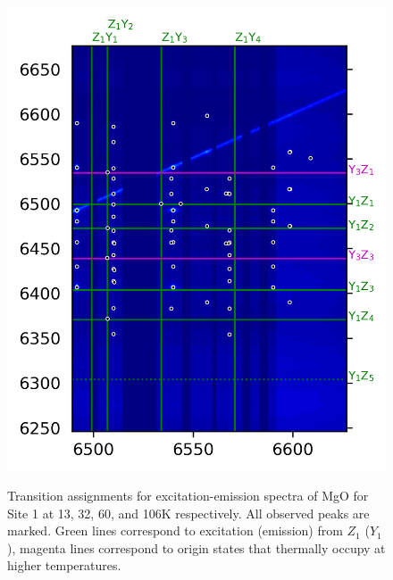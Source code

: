\documentclass[12pt]{report}
\begin{document}
\begin{figure}[b]
{    \includegraphics[scale=0.97]{JinD_site1_106K}
  }{}
  \caption{Transition assignments for excitation-emission spectra of MgO for Site 1 at 13, 32, 60, and 106K respectively. All observed peaks are marked. Green lines correspond to excitation (emission) from $Z_{1}$ ($Y_{1}$), magenta lines correspond to origin states that thermally occupy at higher temperatures.}
  \label{fig:mgosite1}
\end{figure}
\end{document}
